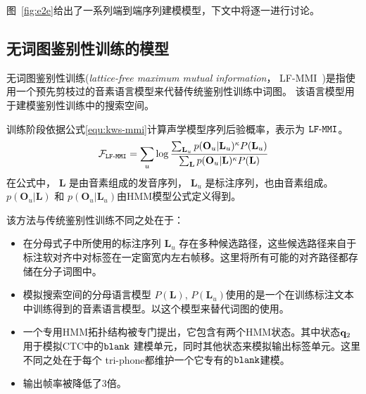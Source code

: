 图~\ref{fig:e2e}给出了一系列端到端序列建模模型，下文中将逐一进行讨论。

\subsection{无词图鉴别性训练的模型}
\label{chap:intro2-e2e-lfmmi}

无词图鉴别性训练({\em lattice-free maximum mutual information}， LF-MMI~\cite{povey2016purely,chen2006advances})是指使用一个预先剪枝过的音素语言模型来代替传统鉴别性训练中词图。
该语言模型用于建模鉴别性训练中的搜索空间。

训练阶段依据公式\ref{equ:kws-mmi}计算声学模型序列后验概率，表示为 $\tt{LF\text{-}MMI}$。
\begin{equation}
\label{equ:kws-mmi}
\begin{split}
\mathcal{F}_{\tt{LF\text{-}MMI}}
=\sum_{u} \log \frac {\sum_{\mathbf{L}_u} p(\mathbf{O}_u|\mathbf{L}_u)^{\kappa}P(\mathbf{L}_u)}{\sum_{\mathbf{L}} p(\mathbf{O}_u|\mathbf{L})^{\kappa}P(\mathbf{L})}  
\end{split}
\end{equation}
在公式中， $\mathbf{L}$ 是由音素组成的发音序列， $\mathbf{L}_u$ 是标注序列，也由音素组成。
$p(\mathbf{O}_u|\mathbf{L})$ 和 $p(\mathbf{O}_u|\mathbf{L}_u)$由HMM模型公式定义得到。 


该方法与传统鉴别性训练不同之处在于： 
\begin{itemize}
\item 在分母式子中所使用的标注序列 $\mathbf{L}_u$ 存在多种候选路径，这些候选路径来自于标注软对齐中对标签在一定窗宽内左右帧移。这里将所有可能的对齐路径都存储在分子词图中。
\item 模拟搜索空间的分母语言模型 $P(\mathbf{L})$, $P(\mathbf{L}_u)$使用的是一个在训练标注文本中训练得到的音素语言模型。以这个模型来替代词图的使用。
\item 一个专用HMM拓扑结构被专门提出，它包含有两个HMM状态。其中状态${\bf q}_2$ 用于模拟CTC中的$\tt blank$ 建模单元，同时其他状态来模拟输出标签单元。这里不同之处在于每个 tri-phone都维护一个它专有的$\tt blank$建模。
\item 输出帧率被降低了3倍。
\end{itemize}


